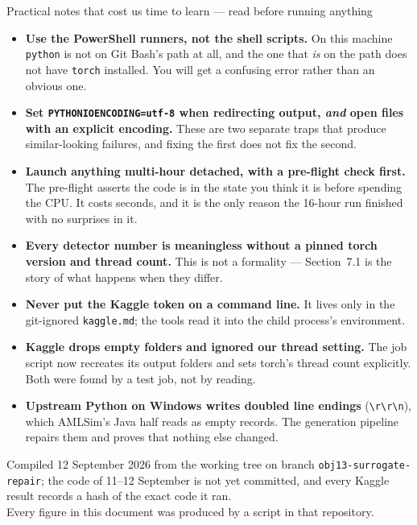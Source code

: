 \documentclass[11pt]{article}
\begin{document}
\begin{keybox}{Practical notes that cost us time to learn --- read before running anything}
\begin{itemize}[topsep=2pt]
\item \textbf{Use the PowerShell runners, not the shell scripts.} On this machine \texttt{python} is not
on Git Bash's path at all, and the one that \emph{is} on the path does not have \texttt{torch}
installed. You will get a confusing error rather than an obvious one.
\item \textbf{Set \texttt{PYTHONIOENCODING=utf-8} when redirecting output, \emph{and} open files with an
explicit encoding.} These are two separate traps that produce similar-looking failures, and fixing the
first does not fix the second.
\item \textbf{Launch anything multi-hour detached, with a pre-flight check first.} The pre-flight
asserts the code is in the state you think it is before spending the CPU. It costs seconds, and it is
the only reason the 16-hour run finished with no surprises in it.
\item \textbf{Every detector number is meaningless without a pinned torch version and thread count.}
This is not a formality --- Section~7.1 is the story of what happens when they differ.
\item \textbf{Never put the Kaggle token on a command line.} It lives only in the git-ignored
\texttt{kaggle.md}; the tools read it into the child process's environment.
\item \textbf{Kaggle drops empty folders and ignored our thread setting.} The job script now recreates its
output folders and sets torch's thread count explicitly. Both were found by a test job, not by reading.
\item \textbf{Upstream Python on Windows writes doubled line endings} (\texttt{\textbackslash r\textbackslash r\textbackslash n}),
which AMLSim's Java half reads as empty records. The generation pipeline repairs them and proves that
nothing else changed.
\end{itemize}
\end{keybox}

\vfill
\begin{center}\footnotesize\color{steel}
Compiled 12 September 2026 from the working tree on branch \texttt{obj13-surrogate-repair}; the code of 11--12 September is not yet committed, and every Kaggle result records a hash of the exact code it ran.\\
Every figure in this document was produced by a script in that repository.
\end{center}
\end{document}
